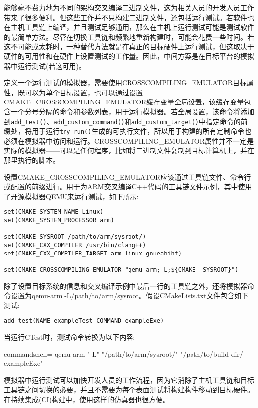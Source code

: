 
能够毫不费力地为不同的架构交叉编译二进制文件，这为相关人员的开发人员工作带来了很多便利。但这些工作并不只构建二进制文件，还包括运行测试。若软件也在主机工具链上编译，并且测试足够通用，那么在主机上运行测试可能是测试软件的最简单方法。尽管在切换工具链和频繁地重新构建时，可能会花费一些时间。若这不可能或太耗时，一种替代方法就是在真正的目标硬件上运行测试，但这取决于硬件的可用性和在硬件上设置测试的工作量。因此，中间方案是在目标平台的模拟器中运行测试(若这可用)。

定义一个运行测试的模拟器，需要使用CROSSCOMPILING\_EMULATOR目标属性，既可以为单个目标设置，也可以通过设置CMAKE\_CROSSCOMPILING\_EMULATOR缓存变量全局设置，该缓存变量包含一个分号分隔的命令和参数列表，用于运行模拟器。若全局设置，该命令将添加到\texttt{add\_test()}、\texttt{add\_custom\_command()}和\texttt{add\_custom\_target()}中指定命令的前缀处，将用于运行\texttt{try\_run()}生成的可执行文件，所以用于构建的所有定制命令也必须在模拟器中访问和运行。CROSSCOMPILING\_EMULATOR属性并不一定是实际的模拟器——可以是任何程序，比如将二进制文件复制到目标计算机上，并在那里执行的脚本。

设置CMAKE\_CROSSCOMPILING\_EMULATOR应该通过工具链文件、命令行或配置的前缀进行。用于为ARM交叉编译C++代码的工具链文件示例，其中使用了开源模拟器QEMU来运行测试，如下所示:

\begin{lstlisting}[style=styleCMake]
set(CMAKE_SYSTEM_NAME Linux)
set(CMAKE_SYSTEM_PROCESSOR arm)

set(CMAKE_SYSROOT /path/to/arm/sysroot/)
set(CMAKE_CXX_COMPILER /usr/bin/clang++)
set(CMAKE_CXX_COMPILER_TARGET arm-linux-gnueabihf)

set(CMAKE_CROSSCOMPILING_EMULATOR "qemu-arm;-L;${CMAKE_	SYSROOT}")
\end{lstlisting}

除了设置目标系统的信息和交叉编译示例中最后一行的工具链之外，还将模拟器命令设置为qemu-arm -L/path/to/arm/sysroot。假设CMakeLists.txt文件包含如下测试:

\begin{lstlisting}[style=styleCMake]
add_test(NAME exampleTest COMMAND exampleExe)
\end{lstlisting}

当运行CTest时，测试命令转换为以下内容:

\begin{tcblisting}{commandshell={}}
qemu-arm "-L" "/path/to/arm/sysroot/" "/path/to/build-dir/
  exampleExe"
\end{tcblisting}

模拟器中运行测试可以加快开发人员的工作流程，因为它消除了主机工具链和目标工具链之间切换的必要，并且不需要为每个表面测试将构建构件移动到目标硬件。在持续集成(CI)构建中，使用这样的仿真器也很方便。

